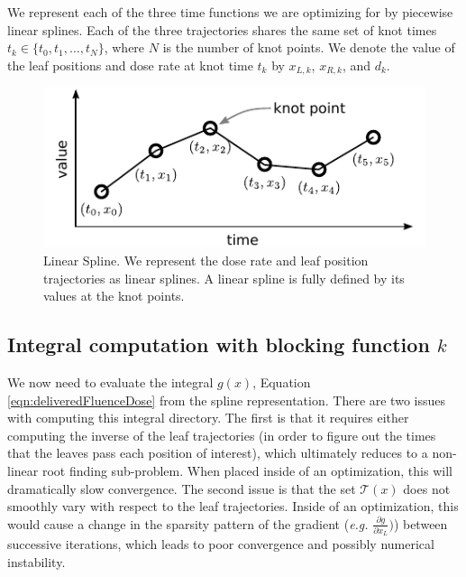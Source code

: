 \documentclass[12pt]{article}
\begin{document}
We represent each of the three time functions we are optimizing for
by piecewise linear splines. Each of the three trajectories shares the same set of knot times $t_k \in \{t_0, t_1, \dots, t_N\}$, where $N$ is the number of knot points. We denote the value of the leaf positions and dose rate at knot time $t_k$ by $x_{L,k}$, $x_{R,k}$, and $d_k$.

\begin{figure}
  \centering
  \includegraphics{fig/linearSpline.pdf}
  \caption{Linear Spline. We represent the dose rate and leaf position trajectories as linear splines. A linear spline is fully defined by its values at the knot points. }
  \label{fig:linearSpline}
\end{figure}

\subsection{Integral computation with blocking function $k$}
\label{sec:IntegralComputationWithBlockingFunction}

We now need to evaluate the integral $g(x)$, Equation \ref{eqn:deliveredFluenceDose} from the spline representation.
There are two issues with computing this integral directory.
The first is that it requires either computing the inverse of the leaf trajectories (in order to figure out the times that the leaves pass each position of interest), which
ultimately reduces to a non-linear root finding sub-problem. When placed inside of an optimization, this will dramatically slow convergence.
The second issue is that the set $\mathcal{T}(x)$ does not smoothly vary with respect to the leaf trajectories.
Inside of an optimization, this would cause a change in the sparsity pattern of the gradient
(\textit{e.g.} $\tfrac{\partial g}{\partial x_L})$)
between successive iterations,
which leads to poor convergence and possibly numerical instability.
\end{document}
